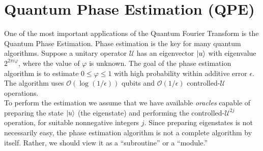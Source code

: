 \documentclass{book}
\theoremstyle{definition}
\newcommand{\U}{\mathcal{U}}
\begin{document}
%
%
%






\newpage






\section{Quantum Phase Estimation (QPE)}

One of the most important applications of the Quantum Fourier Transform is the Quantum Phase Estimation. Phase estimation is the key for many quantum algorithms. Suppose a unitary operator $\U$ has an eigenvector $\ket{u}$ with eigenvalue $2^{2\pi i \varphi}$, where the value of $\varphi$ is unknown. The goal of the phase estimation algorithm is to estimate $0 \leq \varphi \leq 1$ with high probability within additive error $\epsilon$. The algorithm uses $\mathcal{O}(\log (1/\epsilon))$ qubits and $\mathcal{O}(1/\epsilon)$ controlled-$\U$ operations. \\

To perform the estimation we assume that we have available \textit{oracles} capable of preparing the state $\ket{u}$ (the eigenstate) and performing the controlled-$\U^{2j}$ operation, for suitable nonnegative integers $j$. Since preparing eigenstates is not necessarily easy, the phase estimation algorithm is not a complete algorithm by itself. Rather, we should view it as a ``subroutine'' or a ``module.''\\
\end{document}
